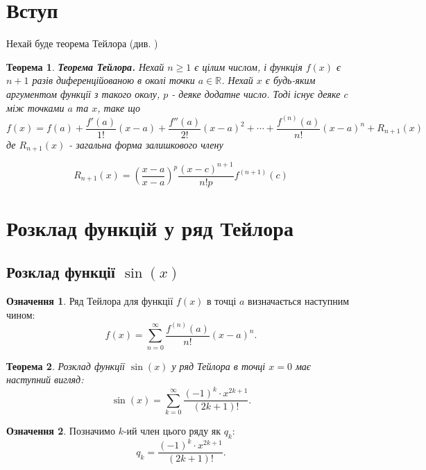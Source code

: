\documentclass[14pt,a4paper,twoside]{extarticle} %
\theoremstyle{definition}
\newtheorem{definition}{Означення}[section] %
\theoremstyle{plain}
\newtheorem{theorem}{Теорема}[section] %
\theoremstyle{plain}
\begin{document}
	
	\section{Вступ}
	Нехай буде теорема Тейлора (див. \cite{weisstein})
	\begin{theorem}\label{ttt1}
		\textbf{Теорема Тейлора.} Нехай $n\geq1$ є цілим числом, і функція $f(x)$ є $n+1$ разів диференційованою в околі точки $a\in\mathbb{R}$. Нехай $x$ є будь-яким аргументом функції з такого околу, $p$ - деяке додатне число. Тоді існує деяке $c$ між точками $a$ та $x$, таке що
		\begin{equation}\label{mvm}
			f(x)=f(a)+\frac{f'(a)}{1!}(x-a)+\frac{f''(a)}{2!}(x-a)^2+\cdots+\frac{f^{(n)}(a)}{n!}(x-a)^n+R_{n+1}(x)
		\end{equation}
		де $R_{n+1}(x)$ - загальна форма залишкового члену
		
		\begin{equation}\label{xcxxxs}
			R_{n+1}(x)=\left(\frac{x-a}{x-a}\right)^p \frac{(x-c)^{n+1}}{n!p}f^{(n+1)}(c)
		\end{equation}

		\end{theorem}
	\section{Розклад функцій у ряд Тейлора}
	
	\subsection{Розклад функції \( \sin(x) \)}
	
	\begin{definition}
		Ряд Тейлора для функції \( f(x) \) в точці \( a \) визначається наступним чином:
		\[
		f(x) = \sum_{n=0}^{\infty} \frac{f^{(n)}(a)}{n!}(x-a)^n.
		\]
	\end{definition}
	
	\begin{theorem}
		Розклад функції \( \sin(x) \) у ряд Тейлора в точці \( x = 0 \) має наступний вигляд:
		\begin{equation} \label{eq:sin_series}
			\sin(x) = \sum_{k=0}^{\infty} \frac{(-1)^k \cdot x^{2k+1}}{(2k + 1)!}.
		\end{equation}
	\end{theorem}
	
	\begin{definition}
		Позначимо \( k \)-ий член цього ряду як \( q_k \):
		\begin{equation} \label{eq:qk_def}
			q_k = \frac{(-1)^k \cdot x^{2k+1}}{(2k + 1)!}.
		\end{equation}
	\end{definition}
	
\end{document}
